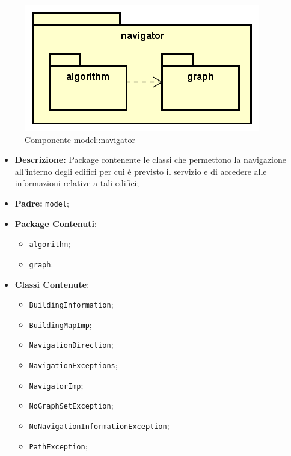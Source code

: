 \documentclass[../DefinizioneDiProdotto.tex]{subfiles}
\begin{document}
\begin{figure}[H]
	\centering
	\includegraphics[width=\maxwidth]{img/package/navigator.png}
	\caption{Componente model::\-navigator}\label{fig:model::navigator} 
\end{figure}
\begin{itemize}
	\item \textbf{Descrizione:} Package contenente le classi che permettono la navigazione all'interno degli edifici per cui è previsto il servizio e di accedere alle informazioni relative a tali edifici;
	\item \textbf{Padre:} \texttt{model};
	\item \textbf{Package Contenuti}:
	\begin{itemize}
		\item \texttt{algorithm};
		
		\item \texttt{graph}.
		
	\end{itemize}
	\item \textbf{Classi Contenute}:
	\begin{itemize}
		\item \texttt{BuildingInformation};
		
		\item \texttt{BuildingMapImp};
		
		\item \texttt{NavigationDirection};
		
		\item \texttt{NavigationExceptions};
		
		\item \texttt{NavigatorImp};
		
		\item \texttt{NoGraphSetException};
		
		\item \texttt{NoNavigationInformationException};
		
		\item \texttt{PathException};
		

\end{itemize}
\end{itemize}
\end{document}
